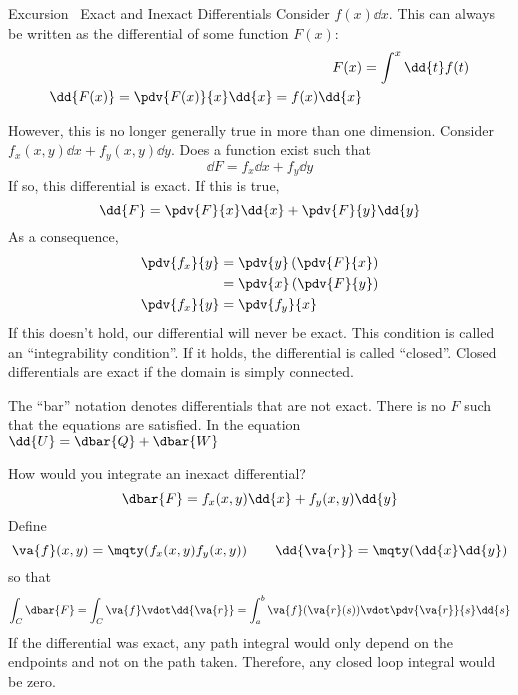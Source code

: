 \documentclass[a4paper,twoside,master.tex]{subfiles}
\begin{document}

\begin{note}{Excursion \textendash\ Exact and Inexact Differentials}
    Consider $ f(x) \dd{x} $. This can always be written as the differential of some function $ F(x) $:
    \begin{align}
        F(x) &= \int^x \dd{t} f(t) \\
        \dd{F(x)} = \pdv{F(x)}{x} \dd{x} = f(x) \dd{x}
    \end{align}

    However, this is no longer generally true in more than one dimension. Consider $ f_x(x,y) \dd{x} + f_y(x,y) \dd{y} $. Does a function exist such that
    \begin{equation}
        \dd{F} = f_x \dd{x} + f_y \dd{y}
    \end{equation}
    If so, this differential is exact. If this is true,
    \begin{equation}
        \dd{F} = \pdv{F}{x} \dd{x} + \pdv{F}{y} \dd{y}
    \end{equation}
    As a consequence, 
    \begin{align}
        \pdv{f_x}{y} &= \pdv{y}\left( \pdv{F}{x} \right) \\
        &= \pdv{x}\left( \pdv{F}{y} \right) \\
        \pdv{f_x}{y} &= \pdv{f_y}{x}
    \end{align}
    If this doesn't hold, our differential will never be exact. This condition is called an ``integrability condition''. If it holds, the differential is called ``closed''. Closed differentials are exact if the domain is simply connected.

    The ``bar'' notation denotes differentials that are not exact. There is no $ F $ such that the equations are satisfied. In the equation $ \dd{U} = \dbar{Q} + \dbar{W} $ 
\end{note}

How would you integrate an inexact differential?
\begin{equation}
    \dbar{F} = f_x(x,y) \dd{x} + f_y(x,y) \dd{y}
\end{equation}
Define
\begin{equation}
    \va{f}(x,y) = \mqty(f_x(x,y) \\ f_y(x,y)) \qquad \dd{\va{r}} = \mqty(\dd{x} \\ \dd{y})
\end{equation}
so that
\begin{equation}
    \int_C \dbar{F} = \int_C \va{f} \vdot \dd{\va{r}} = \int_a^b \va{f}(\va{r}(s)) \vdot \pdv{\va{r}}{s} \dd{s}
\end{equation}
If the differential was exact, any path integral would only depend on the endpoints and not on the path taken. Therefore, any closed loop integral would be zero.
\end{document}
